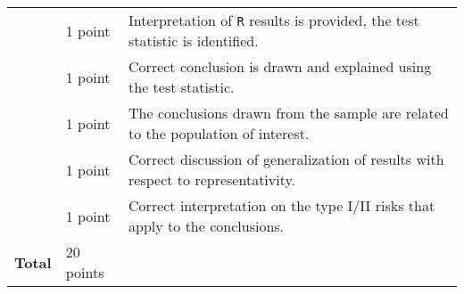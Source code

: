 \begin{center}
\begin{tabularx}{\textwidth}{l|l|>{\raggedright\arraybackslash}X}
     & 1 point & Interpretation of \texttt{R} results is provided, the test statistic is identified. \\
     & 1 point & Correct conclusion is drawn and explained using the test statistic. \\
     & 1 point & The conclusions drawn from the sample are related to the population of interest. \\
     & 1 point & Correct discussion of generalization of results with respect to representativity. \\
     & 1 point & Correct interpretation on the type I/II risks that apply to the conclusions. \\
     \hline
     \textbf{Total} & 20 points & \\
\end{tabularx}
\end{center}

\normalfont

\clearpage %
